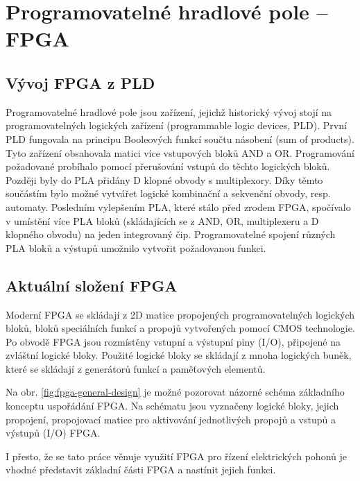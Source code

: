 \documentclass[a4paper, twoside, 11pt]{article}
\begin{document}
	\section{Programovatelné hradlové pole – FPGA}
		\subsection{Vývoj FPGA z PLD}
		Programovatelné hradlové pole jsou zařízení, jejichž historický vývoj stojí na programovatelných logických zařízení (programmable logic devices, PLD). První PLD fungovala na principu Booleových funkcí součtu násobení (sum of products). Tyto zařízení obsahovala matici více vstupových bloků AND a OR. Programování požadované probíhalo pomocí přerušování vstupů do těchto logických bloků. Později byly do PLA přidány D klopné obvody s multiplexory. Díky těmto součástím bylo možné vytvářet logické kombinační a sekvenční obvody, resp. automaty. Posledním vylepšením PLA, které stálo před zrodem FPGA, spočívalo v umístění více PLA bloků (skládajících se z AND, OR, multiplexeru a D klopného obvodu) na jeden integrovaný čip. Programovatelné spojení různých PLA bloků a výstupů umožnilo vytvořit požadovanou funkci. \cite{Sass2010}\par

		\subsection{Aktuální složení FPGA}
		Moderní FPGA se skládají z 2D matice propojených programovatelných logických bloků, bloků speciálních funkcí a propojů vytvořených pomocí CMOS technologie. Po obvodě FPGA jsou rozmístěny vstupní a výstupní piny (I/O), připojené na zvláštní logické bloky. Použité logické bloky se skládají z mnoha logických buněk, které se skládají z generátorů funkcí a paměťových elementů. \cite{Sass2010}\par
		Na obr. \ref{fig:fpga-general-design} je možné pozorovat názorné schéma základního konceptu uspořádání FPGA. Na schématu jsou vyznačeny logické bloky, jejich propojení, propojovací matice pro aktivování jednotlivých propojů a vstupů a výstupů (I/O) FPGA.\par
		I přesto, že se tato práce věnuje využití FPGA pro řízení elektrických pohonů je vhodné představit základní části FPGA a nastínit jejich funkci.
\end{document}
